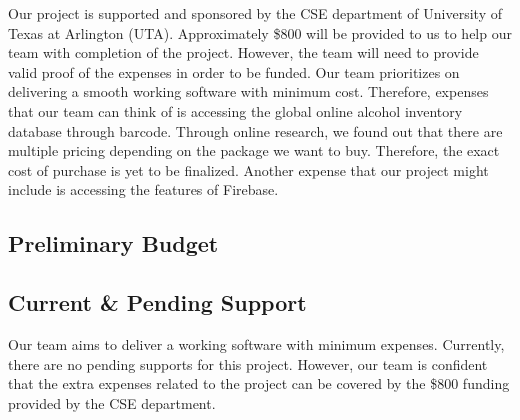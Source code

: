 Our project is supported and sponsored by the CSE department of University of Texas at Arlington (UTA). 
Approximately \$800 will be provided to us to help our team with completion of the project. However, the team 
will need to provide valid proof of the expenses in order to be funded. Our team prioritizes on delivering a 
smooth working software with minimum cost. Therefore, expenses that our team can think of is accessing the 
global online alcohol inventory database through barcode. Through online research, we found out that there 
are multiple pricing depending on the package we want to buy. Therefore, the exact cost of purchase is yet 
to be finalized. Another expense that our project might include is accessing the features of Firebase.

\subsection{Preliminary Budget}
\begin{table}[h]
    \caption{Overview of highest exposure project risks} 
    \end{table}
\subsection{Current \& Pending Support}
Our team aims to deliver a working software with minimum expenses. Currently, there are no pending supports 
for this project. However, our team is confident that the extra expenses related to the project can be covered 
by the \$800 funding provided by the CSE department.